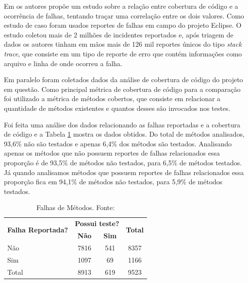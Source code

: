 \documentclass[11.5pt]{article}
\begin{document}
Em \cite{unitTestedCrash} os autores propõe um estudo sobre a relação entre cobertura de código
e a ocorrência de falhas, tentando traçar uma correlação entre os dois valores.
Como estudo de caso foram usados reportes de falhas em campo do projeto Eclipse.
O estudo coletou mais de 2 milhões de incidentes reportados e, após triagem de dados os autores
tinham em mãos mais de 126 mil reportes únicos do tipo \textit{stack trace}, que consiste em um tipo
de reporte de erro que contém informações como arquivo e linha de onde ocorreu a falha.

Em paralelo foram coletados dados da análise de cobertura de código do projeto em questão.
Como principal métrica de cobertura de código para a comparação foi utilizado a métrica de métodos
cobertos, que consiste em relacionar a quantidade de métodos existentes e quantos desses são
invocados nos testes.

Foi feita uma análise dos dados relacionando as falhas reportadas e a cobertura de código e a Tabela
\ref{tab:FalhasMetodosTeste} mostra os dados obtidos.
Do total de métodos analisados, 93,6\% não são testados e apenas 6,4\% dos métodos são testados.
Analisando apenas os métodos que não possuem reportes de falhas relacionados essa proporção é de
93,5\% de métodos não testados, para 6,5\% de métodos testados.
Já quando analisamos métodos que possuem reportes de falhas relacionados essa proporção fica em
94,1\% de métodos não testados, para 5,9\% de métodos testados.

\begin{table}[ht]
\centering
\caption{Falhas de Métodos. Fonte: \cite{unitTestedCrash}}
\label{tab:FalhasMetodosTeste}
\begin{tabular}{|l|c|c|c|}
\hline
\multirow{2}{*}{\textbf{Falha Reportada?}} & \multicolumn{2}{c|}{\textbf{Possui teste?}} & \multirow{2}{*}{\textbf{Total}} \\ \cline{2-3}
                                  & \textbf{Não}   & \textbf{Sim}                        &       \\ \hline
Não                               & 7816  & 541                        & 8357  \\ \hline
Sim                               & 1097  &  69                        & 1166  \\ \hline \hline
Total                             & 8913  & 619                        & 9523  \\ \hline
\end{tabular}
\end{table}
\end{document}
